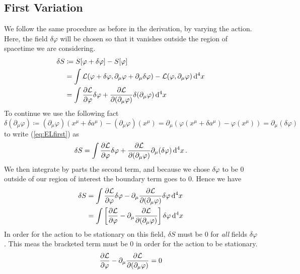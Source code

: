 \subsection{First Variation}
We follow the same procedure as before in the derivation, by varying the action.
Here, the field \(\delta\varphi\) will be chosen so that it vanishes outside the
region of spacetime we are considering.
\begin{align}\label{eq:ELfirst}
    \delta S & \coloneqq S[\varphi + \delta\varphi] - S[\varphi] \nonumber                                                                                   \\
             & = \int \mathcal{L}(\varphi + \delta\varphi, \partial_\mu\varphi + \partial_\mu\delta\varphi) - \mathcal{L}(\varphi, \partial_\mu\varphi)\dd[4]{x} \nonumber \\
             & = \int \pdv{\mathcal{L}}{\varphi}\delta\varphi + \pdv{\mathcal{L}}{(\partial_\mu\varphi)}\delta{(\partial_\mu\varphi)}\dd[4]{x}
\end{align}
To continue we use the following fact
\begin{equation*}
    \delta(\partial_\mu\varphi)\coloneqq (\partial_\mu\varphi)(x^\mu + \delta a^\mu) - (\partial_\mu\varphi)(x^\mu) = \partial_\mu(\varphi(x^\mu + \delta a^\mu) - \varphi(x^\mu)) = \partial_\mu(\delta\varphi)
\end{equation*}
to write (\ref{eq:ELfirst}) as
\begin{equation}
    \delta S = \int \pdv{\mathcal{L}}{\varphi}\delta\varphi + \pdv{\mathcal{L}}{(\partial_\mu\varphi)}\partial_\mu(\delta\varphi)\dd[4]{x}.
\end{equation}
We then integrate by parts the second term, and because we chose
\(\delta\varphi\) to be 0 outside of our region of interest the boundary term
goes to 0. Hence we have
\begin{align}
    \delta S & = \int \pdv{\mathcal{L}}{\varphi}\delta\varphi - \partial_\mu\pdv{\mathcal{L}}{(\partial_\mu\varphi)}\delta\varphi\dd[4]{x} \nonumber \\
             & = \int \left[\pdv{\mathcal{L}}{\varphi} - \partial_\mu \pdv{\mathcal{L}}{(\partial_\mu\varphi)} \right]\delta\varphi\dd[4]{x}
\end{align}
In order for the action to be stationary on this field, \(\delta S\) must be 0
for \textit{all} fields \(\delta\varphi\). This meas the bracketed term must be
0 in order for the action to be stationary.
\begin{equation}\label{eq:ELfields}
    \pdv{\mathcal{L}}{\varphi} - \partial_\mu \pdv{\mathcal{L}}{(\partial_\mu\varphi)} = 0
\end{equation}
